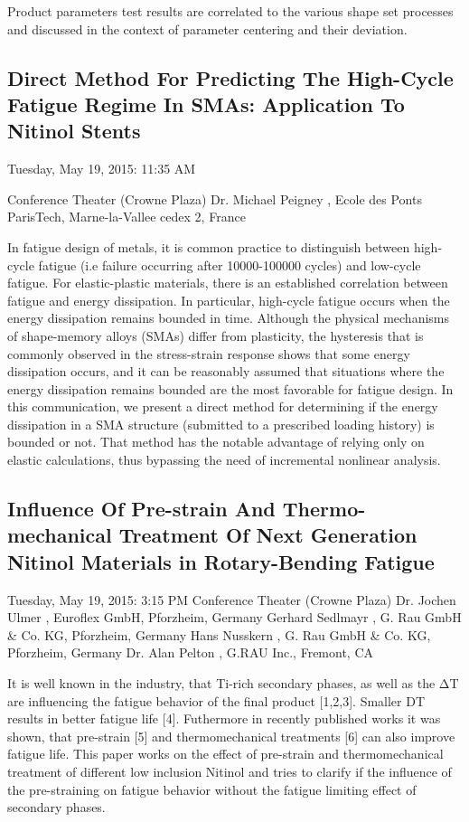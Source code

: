 \documentclass[12pt, a4paper]{article}
\begin{document}
Product parameters test results are correlated to the various shape set processes and discussed in the context of parameter centering and their deviation.

\subsection*{ Direct Method For Predicting The High-Cycle Fatigue Regime In SMAs: Application To Nitinol Stents}
Tuesday, May 19, 2015: 11:35 AM

\noindent Conference Theater (Crowne Plaza)
Dr. Michael Peigney , Ecole des Ponts ParisTech, Marne-la-Vallee cedex 2, France

\noindent In fatigue design of metals, it is common practice to distinguish between high-cycle fatigue (i.e failure occurring after 10000-100000 cycles) and low-cycle fatigue. For elastic-plastic materials, there is an established correlation between fatigue and energy dissipation. In particular, high-cycle fatigue occurs when the energy dissipation remains bounded in time. Although the physical mechanisms of shape-memory alloys (SMAs) differ from plasticity, the hysteresis that is commonly observed in the stress-strain response shows that some energy dissipation occurs, and it can be reasonably assumed that situations where the energy dissipation remains bounded are the most favorable for fatigue design. In this communication, we present a direct method for determining if the energy dissipation in a SMA structure (submitted to a prescribed loading history) is bounded or not. That method has the notable advantage of relying only on elastic calculations, thus bypassing the need of incremental nonlinear analysis.


\subsection*{Influence Of Pre-strain And Thermo-mechanical Treatment Of Next Generation Nitinol Materials in Rotary-Bending Fatigue}

\noindent Tuesday, May 19, 2015: 3:15 PM
Conference Theater (Crowne Plaza)
Dr. Jochen Ulmer , Euroflex GmbH, Pforzheim, Germany
Gerhard Sedlmayr , G. Rau GmbH & Co. KG, Pforzheim, Germany
Hans Nusskern , G. Rau GmbH & Co. KG, Pforzheim, Germany
Dr. Alan Pelton , G.RAU Inc., Fremont, CA

\noindent It is well known in the industry, that Ti-rich secondary phases, as well as the ΔT are influencing the fatigue behavior of the final product [1,2,3]. Smaller DT results in better fatigue life [4]. Futhermore in recently published works it was shown, that pre-strain [5] and thermomechanical treatments [6] can also improve fatigue life. This paper works on the effect of pre-strain and thermomechanical treatment of different low inclusion Nitinol and tries to clarify if the influence of the pre-straining on fatigue behavior without the fatigue limiting effect of secondary phases. 
\end{document}
